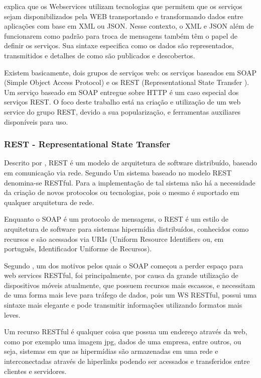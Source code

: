 \documentclass[12pt]{article}
\begin{document}
\cite{souza04} explica que os Webservices utilizam tecnologias que permitem que
os serviços sejam disponibilizados pela WEB transportando e transformando dados
entre aplicações com base em XML ou JSON. Nesse contexto, o XML e JSON além de
funcionarem como padrão para troca de mensagens também têm o papel de definir os
serviços. Sua sintaxe especifica como os dados são representados, transmitidos e
detalhes de como são publicados e descobertos.

Existem basicamente, dois grupos de serviços web: os serviços baseados em SOAP (Simple Object Access Protocol) e os REST (Representational
State Transfer ). Um serviço baseado em SOAP entregue sobre HTTP é um caso especial dos serviços REST. O foco deste trabalho está na criação e utilização de um web service do grupo REST, devido a sua popularização, e ferramentas auxiliares disponíveis para uso.

\subsubsection{REST - Representational State Transfer}

Descrito por \cite{rest}, REST é um modelo de arquitetura de software distribuído, baseado em comunicação via rede.
Segundo \cite{richard:07} Um sistema baseado no modelo REST denomina-se RESTful. Para a implementação de tal sistema não há a necessidade da criação de novos protocolos ou tecnologias, pois o mesmo é suportado em qualquer arquitetura de rede.

Enquanto o SOAP é um protocolo de mensagens, o REST é um estilo de arquitetura
de software para sistemas hipermídia distribuídos, conhecidos como recursos e são acessados via URIs (Uniform Resource Identifiers ou, em português, Identificador Uniforme de Recursos). 

Segundo \cite{lecheta:15}, um dos motivos pelos quais o SOAP começou a perder espaço para web services RESTful, foi principalmente, por causa da grande utilização de dispositivos móveis atualmente, que possuem recursos mais escassos, e necessitam de uma forma mais leve para tráfego de dados, pois um WS RESTful, possui uma sintaxe mais elegante e pode transmitir informações utilizando formatos mais leves.

Um recurso RESTful é qualquer coisa que possua um endereço através da web, como por exemplo uma imagem jpg, dados de uma empresa, entre outros, ou seja, sistemas em que as hipermídias são armazenadas em uma rede e interconectadas através de hiperlinks podendo ser acessados e transferidos entre clientes e servidores.
\end{document}
